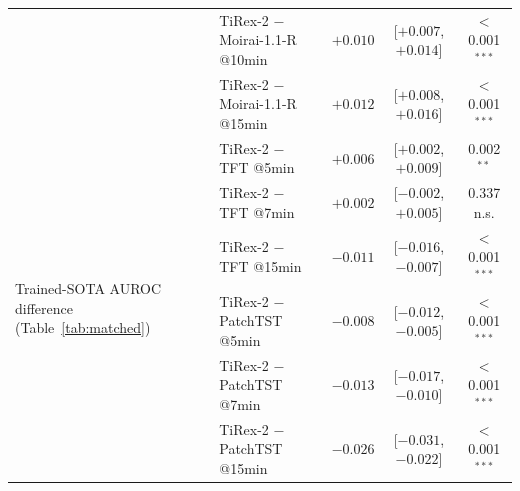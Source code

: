 \begin{table}[t]
\begin{tabular}{p{3cm}lccc}
 & TiRex-2 $-$ Moirai-1.1-R @10min & $+0.010$ & [$+0.007$, $+0.014$] & $<$0.001$^{***}$ \\
 & TiRex-2 $-$ Moirai-1.1-R @15min & $+0.012$ & [$+0.008$, $+0.016$] & $<$0.001$^{***}$ \\
\midrule
\multirow{6}{2.9cm}{\raggedright Trained-SOTA AUROC difference (Table~\ref{tab:matched})}
 & TiRex-2 $-$ TFT @5min       & $+0.006$ & [$+0.002$, $+0.009$] & 0.002$^{**}$ \\
 & TiRex-2 $-$ TFT @7min       & $+0.002$ & [$-0.002$, $+0.005$] & 0.337 n.s. \\
 & TiRex-2 $-$ TFT @15min      & $-0.011$ & [$-0.016$, $-0.007$] & $<$0.001$^{***}$ \\
 & TiRex-2 $-$ PatchTST @5min  & $-0.008$ & [$-0.012$, $-0.005$] & $<$0.001$^{***}$ \\
 & TiRex-2 $-$ PatchTST @7min  & $-0.013$ & [$-0.017$, $-0.010$] & $<$0.001$^{***}$ \\
 & TiRex-2 $-$ PatchTST @15min & $-0.026$ & [$-0.031$, $-0.022$] & $<$0.001$^{***}$ \\
\bottomrule
\end{tabular}
\end{table}



